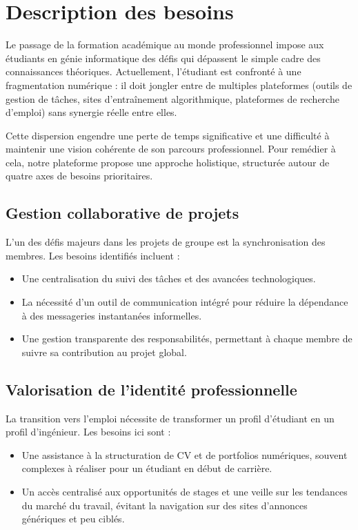 \documentclass[12pt,a4paper]{report}
\begin{document}
\section{Description des besoins}

Le passage de la formation académique au monde professionnel impose aux étudiants en génie informatique des défis qui dépassent le simple cadre des connaissances théoriques. Actuellement, l'étudiant est confronté à une fragmentation numérique : il doit jongler entre de multiples plateformes (outils de gestion de tâches, sites d'entraînement algorithmique, plateformes de recherche d'emploi) sans synergie réelle entre elles. 

Cette dispersion engendre une perte de temps significative et une difficulté à maintenir une vision cohérente de son parcours professionnel. Pour remédier à cela, notre plateforme propose une approche holistique, structurée autour de quatre axes de besoins prioritaires.

\subsection{Gestion collaborative de projets}
L'un des défis majeurs dans les projets de groupe est la synchronisation des membres. Les besoins identifiés incluent :
\begin{itemize}
	\item Une centralisation du suivi des tâches et des avancées technologiques.
	\item La nécessité d'un outil de communication intégré pour réduire la dépendance à des messageries instantanées informelles.
	\item Une gestion transparente des responsabilités, permettant à chaque membre de suivre sa contribution au projet global.
\end{itemize}

\subsection{Valorisation de l'identité professionnelle}
La transition vers l'emploi nécessite de transformer un profil d'étudiant en un profil d'ingénieur. Les besoins ici sont :
\begin{itemize}
	\item Une assistance à la structuration de CV et de portfolios numériques, souvent complexes à réaliser pour un étudiant en début de carrière.
	\item Un accès centralisé aux opportunités de stages et une veille sur les tendances du marché du travail, évitant la navigation sur des sites d'annonces génériques et peu ciblés.
\end{itemize}
\end{document}
